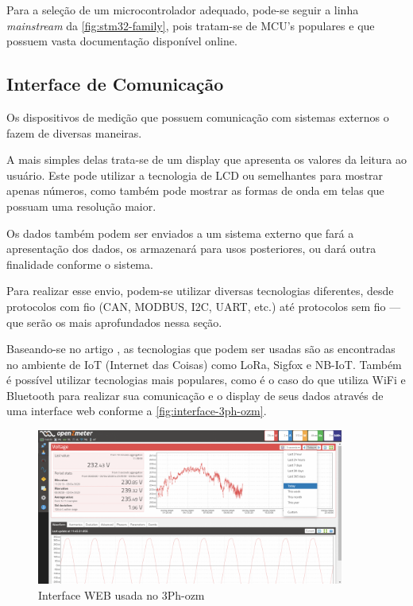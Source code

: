 Para a seleção de um microcontrolador adequado, pode-se seguir a linha \textit{mainstream} da \autoref{fig:stm32-family}, pois tratam-se de \gls{MCU}'s populares e que possuem vasta documentação disponível online.

\subsection{Interface de Comunicação}\label{sec:Interface}

Os dispositivos de medição que possuem comunicação com sistemas externos o fazem de diversas maneiras. 

A mais simples delas trata-se de um display que apresenta os valores da leitura ao usuário. Este pode utilizar a tecnologia de \gls{LCD} ou semelhantes para mostrar apenas números, como também pode mostrar as formas de onda em telas que possuam uma resolução maior.

Os dados também podem ser enviados a um sistema externo que fará a apresentação dos dados, os armazenará para usos posteriores, ou dará outra finalidade conforme o sistema.

Para realizar esse envio, podem-se utilizar diversas tecnologias diferentes, desde protocolos com fio (CAN, MODBUS, I2C, UART, etc.) até protocolos sem fio --- que serão os mais aprofundados nessa seção.

Baseando-se no artigo \citet{lowcost-smartmeter}, as tecnologias que podem ser usadas são as encontradas no ambiente de IoT (Internet das Coisas) como LoRa, Sigfox e NB-IoT. Também é possível utilizar tecnologias mais populares, como é o caso do \citet{3ph-ozm} que utiliza WiFi e Bluetooth para realizar sua comunicação e o display de seus dados através de uma interface web conforme a \autoref{fig:interface-3ph-ozm}.

\begin{figure}[htb]
    \caption{Interface WEB usada no 3Ph-ozm}
    \label{fig:interface-3ph-ozm}
    \includegraphics[width=0.9\textwidth]{figuras/interface-web-openzmeter.png}
\end{figure}

